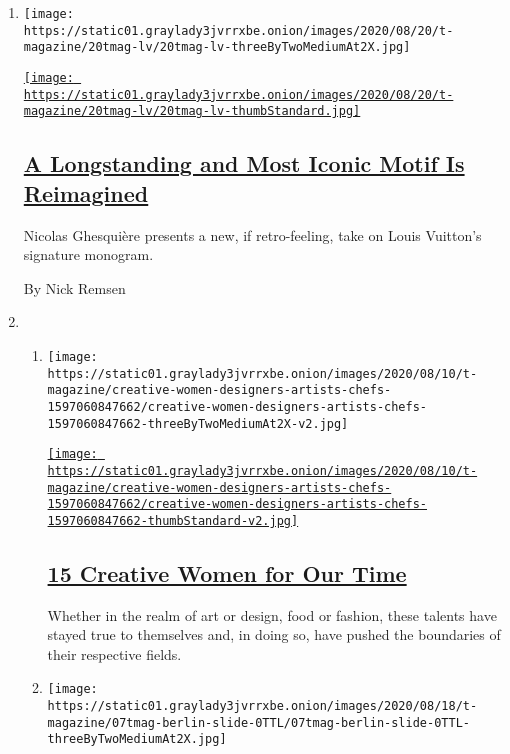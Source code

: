 \begin{enumerate}
\def\labelenumi{\arabic{enumi}.}
\item
  \texttt{[image: https://static01.graylady3jvrrxbe.onion/images/2020/08/20/t-magazine/20tmag-lv/20tmag-lv-threeByTwoMediumAt2X.jpg]}

  \href{/2020/08/20/t-magazine/louis-vuitton-speedy-bag.html}{\texttt{[image: https://static01.graylady3jvrrxbe.onion/images/2020/08/20/t-magazine/20tmag-lv/20tmag-lv-thumbStandard.jpg]}}

  \hypertarget{a-longstanding-and-most-iconic-motif-is-reimagined}{%
  \subsection{\texorpdfstring{\href{/2020/08/20/t-magazine/louis-vuitton-speedy-bag.html}{A
  Longstanding and Most Iconic Motif Is
  Reimagined}}{A Longstanding and Most Iconic Motif Is Reimagined}}\label{a-longstanding-and-most-iconic-motif-is-reimagined}}

  Nicolas Ghesquière presents a new, if retro-feeling, take on Louis
  Vuitton's signature monogram.

  By Nick Remsen
\item
  \begin{enumerate}
  \def\labelenumii{\arabic{enumii}.}
  \item
    \texttt{[image: https://static01.graylady3jvrrxbe.onion/images/2020/08/10/t-magazine/creative-women-designers-artists-chefs-1597060847662/creative-women-designers-artists-chefs-1597060847662-threeByTwoMediumAt2X-v2.jpg]}

    \href{/interactive/2020/08/10/t-magazine/creative-women-designers-artists-chefs.html}{\texttt{[image: https://static01.graylady3jvrrxbe.onion/images/2020/08/10/t-magazine/creative-women-designers-artists-chefs-1597060847662/creative-women-designers-artists-chefs-1597060847662-thumbStandard-v2.jpg]}}

    \hypertarget{15-creative-women-for-our-time}{%
    \subsection{\texorpdfstring{\href{/interactive/2020/08/10/t-magazine/creative-women-designers-artists-chefs.html}{15
    Creative Women for Our
    Time}}{15 Creative Women for Our Time}}\label{15-creative-women-for-our-time}}

    Whether in the realm of art or design, food or fashion, these
    talents have stayed true to themselves and, in doing so, have pushed
    the boundaries of their respective fields.
  \item
    \texttt{[image: https://static01.graylady3jvrrxbe.onion/images/2020/08/18/t-magazine/07tmag-berlin-slide-0TTL/07tmag-berlin-slide-0TTL-threeByTwoMediumAt2X.jpg]}


\end{enumerate}
\end{enumerate}
